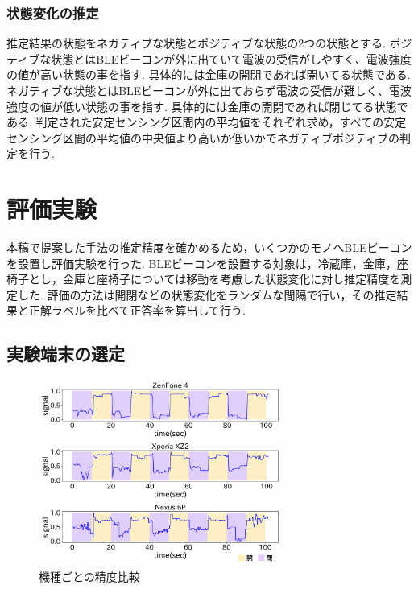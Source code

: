 \documentclass[Japanese]{dicomopapers}
\begin{document}



\subsubsection{状態変化の推定}
推定結果の状態をネガティブな状態とポジティブな状態の2つの状態とする.
ポジティブな状態とはBLEビーコンが外に出ていて電波の受信がしやすく、電波強度の値が高い状態の事を指す. 具体的には金庫の開閉であれば開いてる状態である.
ネガティブな状態とはBLEビーコンが外に出ておらず電波の受信が難しく、電波強度の値が低い状態の事を指す. 具体的には金庫の開閉であれば閉じてる状態である.
判定された安定センシング区間内の平均値をそれぞれ求め，すべての安定センシング区間の平均値の中央値より高いか低いかでネガティブポジティブの判定を行う.





\section{評価実験}

本稿で提案した手法の推定精度を確かめるため，いくつかのモノへBLEビーコンを設置し評価実験を行った.
BLEビーコンを設置する対象は，冷蔵庫，金庫，座椅子とし，金庫と座椅子については移動を考慮した状態変化に対し推定精度を測定した.
評価の方法は開閉などの状態変化をランダムな間隔で行い，その推定結果と正解ラベルを比べて正答率を算出して行う.

\subsection{実験端末の選定}

\begin{figure}[b]
    \centering
    \includegraphics[width=8cm]{mix.png}
    \caption{機種ごとの精度比較}
    \label{multi-data}
\end{figure}
\end{document}
